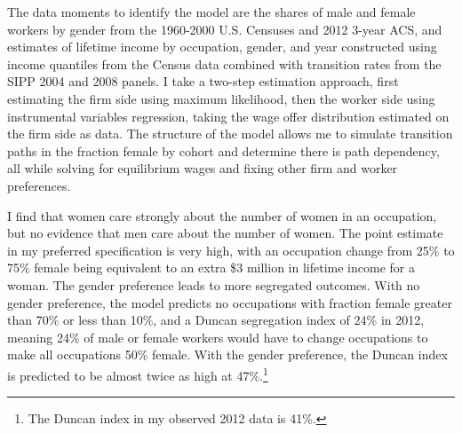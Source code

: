 \documentclass[12pt]{article}
\begin{document}
The data moments to identify the model are the shares of male and female workers by gender from the 1960-2000 U.S. Censuses and 2012 3-year ACS, and estimates of lifetime income by occupation, gender, and year constructed using income quantiles from the Census data combined with transition rates from the SIPP 2004 and 2008 panels. I take a two-step estimation approach, first estimating the firm side using maximum likelihood, then the worker side using instrumental variables regression, taking the wage offer distribution estimated on the firm side as data. The structure of the model allows me to simulate transition paths in the fraction female by cohort and determine there is path dependency, all while solving for equilibrium wages and fixing other firm and worker preferences.
 


I find that women care strongly about the number of women in an occupation, but no evidence that men care about the number of women. The point estimate in my preferred specification is very high, with an occupation change from 25\% to 75\% female being equivalent to an extra \$3 million in lifetime income for a woman. The gender preference leads to more segregated outcomes. With no gender preference, the model predicts no occupations with fraction female greater than 70\% or less than 10\%, and a Duncan segregation index of 24\% in 2012, meaning 24\% of male or female workers would have to change occupations to make all occupations 50\% female. With the gender preference, the Duncan index is predicted to be almost twice as high at 47\%.\footnote{The Duncan index in my observed 2012 data is 41\%.}
\end{document}
